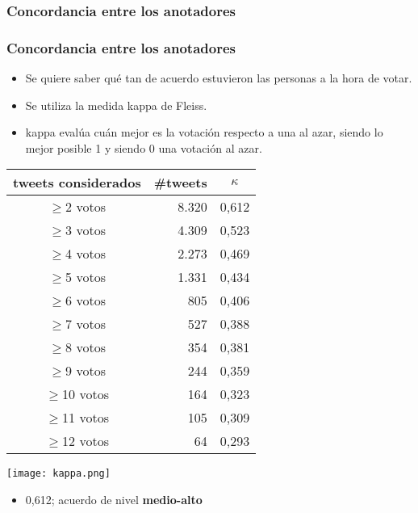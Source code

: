 \subsubsection{Concordancia entre los anotadores}

\begin{frame}[allowframebreaks]
    \frametitle{Concordancia entre los anotadores}

    \begin{itemize}
        \item Se quiere saber qué tan de acuerdo estuvieron las personas a la hora de votar.
        \item Se utiliza la medida kappa de Fleiss.
        \item kappa evalúa cuán mejor es la votación respecto a una al azar, siendo lo mejor posible 1 y siendo 0 una votación al azar.
    \end{itemize}

    \framebreak

    \begin{center}
        \begin{tabular}{ c | r | c }
            tweets considerados & \#tweets & $\kappa$ \\
            \hline
            $\geq$2 votos & 8.320 & 0,612 \\
            $\geq$3 votos & 4.309 & 0,523 \\
            $\geq$4 votos & 2.273 & 0,469 \\
            $\geq$5 votos & 1.331 & 0,434 \\
            $\geq$6 votos & 805 & 0,406 \\
            $\geq$7 votos & 527 & 0,388 \\
            $\geq$8 votos & 354 & 0,381 \\
            $\geq$9 votos & 244 & 0,359 \\
            $\geq$10 votos & 164 & 0,323 \\
            $\geq$11 votos & 105 & 0,309 \\
            $\geq$12 votos & 64 & 0,293 \\
        \end{tabular}

        \texttt{[image: kappa.png]}
    \end{center}

    \framebreak

    \begin{itemize}
        \item \large{0,612; acuerdo de nivel \textbf{medio-alto}}
    \end{itemize}
\end{frame}
